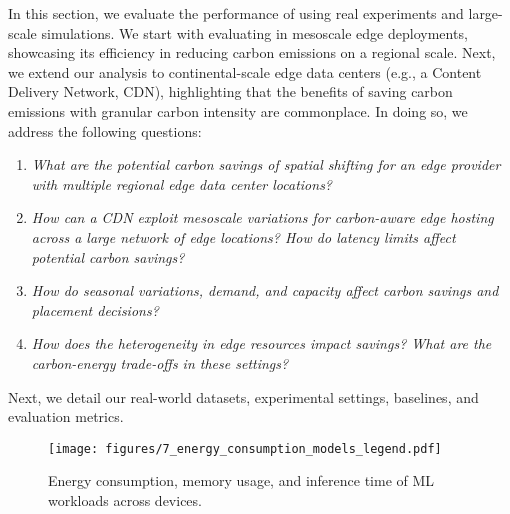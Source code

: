 
In this section, we evaluate the performance of \proposedsystem using real experiments and large-scale simulations. We start with evaluating \proposedsystem in mesoscale edge deployments, showcasing its efficiency in reducing carbon emissions on a regional scale. Next, we extend our analysis to continental-scale edge data centers (e.g., a Content Delivery Network, CDN), highlighting that the benefits of saving carbon emissions with granular carbon intensity are commonplace. In doing so, we address the following questions:

\begin{enumerate}[leftmargin=*]
    \item {\em What are the potential carbon savings of spatial shifting for an edge provider with multiple regional edge data center locations?}
    \item {\em How can a CDN exploit mesoscale variations for carbon-aware edge hosting across a large network of edge locations? How do latency limits affect potential carbon savings?}
    \item {\em How do seasonal variations, demand, and capacity affect carbon savings and placement decisions?}
    \item {\em How does the heterogeneity in edge resources impact savings? What are the carbon-energy trade-offs in these settings?}
\end{enumerate}

Next, we detail our real-world datasets, experimental settings, baselines, and evaluation metrics.

\begin{figure}[t]
    \centering
    \texttt{[image: figures/7\_energy\_consumption\_models\_legend.pdf]}\\
    \caption{Energy consumption, memory usage, and inference time of ML workloads across devices.}
    \label{fig:models_profile}
\end{figure}

